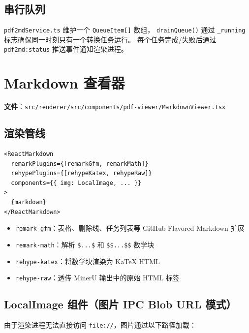 \documentclass[12pt, a4paper]{article}
\begin{document}
\subsection{串行队列}

\texttt{pdf2mdService.ts} 维护一个 \texttt{QueueItem[]} 数组，
\texttt{drainQueue()} 通过 \texttt{\_running} 标志确保同一时刻只有一个转换任务运行。
每个任务完成/失败后通过 \texttt{pdf2md:status} 推送事件通知渲染进程。

\section{Markdown 查看器}
\label{sec:markdownviewer}

\textbf{文件}：\texttt{src/renderer/src/components/pdf-viewer/MarkdownViewer.tsx}

\subsection{渲染管线}

\begin{lstlisting}[language={}]
<ReactMarkdown
  remarkPlugins={[remarkGfm, remarkMath]}
  rehypePlugins={[rehypeKatex, rehypeRaw]}
  components={{ img: LocalImage, ... }}
>
  {markdown}
</ReactMarkdown>
\end{lstlisting}

\begin{itemize}[leftmargin=2em, itemsep=2pt]
  \item \texttt{remark-gfm}：表格、删除线、任务列表等 GitHub Flavored Markdown 扩展
  \item \texttt{remark-math}：解析 \texttt{\$...\$} 和 \texttt{\$\$...\$\$} 数学块
  \item \texttt{rehype-katex}：将数学块渲染为 KaTeX HTML
  \item \texttt{rehype-raw}：透传 MinerU 输出中的原始 HTML 标签
\end{itemize}

\subsection{LocalImage 组件（图片 IPC Blob URL 模式）}

由于渲染进程无法直接访问 \texttt{file://}，图片通过以下路径加载：
\end{document}
